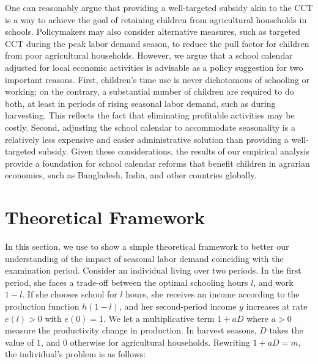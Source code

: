 \documentclass[12pt,letterpaper]{article}\usepackage[margin=1in]{geometry}
\newcommand{\0}{\ensuremath{\mbox{\boldmath $0$}}}
\begin{document}
One can reasonably argue that providing a well-targeted subsidy akin to the CCT is a way to achieve the goal of retaining children from agricultural households in schools. Policymakers may also consider alternative measures, such as targeted CCT during the peak labor demand season, to reduce the pull factor for children from poor agricultural households. However, we argue that a school calendar adjusted for local economic activities is advisable as a policy suggestion for two important reasons. First, children's time use is never dichotomous of schooling or working; on the contrary, a substantial number of children are required to do both, at least in periods of rising seasonal labor demand, such as during harvesting. This reflects the fact that eliminating profitable activities may be costly. Second, adjusting the school calendar to accommodate seasonality is a relatively less expensive and easier administrative solution than providing a well-targeted subsidy. Given these considerations, the results of our empirical analysis provide a foundation for school calendar reforms that benefit children in agrarian economies, such as Bangladesh, India, and other countries globally.




\pagebreak

\doublespacing



\pagebreak
\renewcommand{\thefigure}{A\arabic{figure}}
\renewcommand{\theHfigure}{A\arabic{figure}}
\setcounter{figure}{0}

\renewcommand{\thetable}{A\arabic{table}}
\renewcommand{\theHtable}{A\arabic{table}}
\setcounter{table}{0}

\appendix
\setcounter{secnumdepth}{1}
\setcounter{section}{0}
\renewcommand{\thesection}{A\arabic{section}}


\section{Theoretical Framework}\label{app_a1}
\setcounter{equation}{0}
\renewcommand{\theequation}{A\arabic{equation}}

In this section, we use \cite{BalandRobinson2000} to show a simple theoretical framework to better our understanding of the impact of seasonal labor demand coinciding with the examination period. Consider an individual living over two periods. In the first period, she faces a trade-off between the optimal schooling hours $l$, and work $1-l$. If she chooses school for $l$ hours, she receives an income according to the production function $h(1-l)$, and her second-period income $y$ increases at rate $e(l)>0$ with $e(0) = 1$. We let a multiplicative term $1+aD$ where $a>0$ 	measure the productivity change in production. In harvest seasons, $D$ takes the value of $1$, and $0$ otherwise for agricultural households. Rewriting $1+aD = m$, the individual's problem is as follows:
\end{document}
